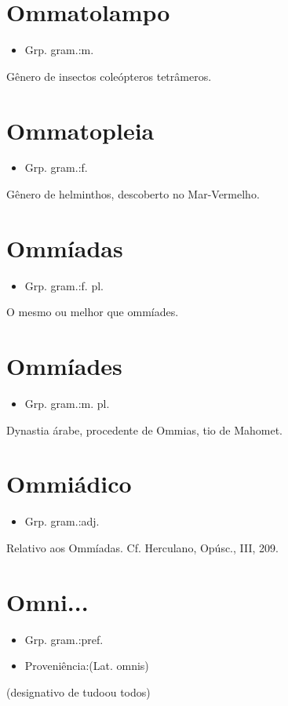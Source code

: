 \section{Ommatolampo}
\begin{itemize}
\item {Grp. gram.:m.}
\end{itemize}
Gênero de insectos coleópteros tetrâmeros.
\section{Ommatopleia}
\begin{itemize}
\item {Grp. gram.:f.}
\end{itemize}
Gênero de helminthos, descoberto no Mar-Vermelho.
\section{Ommíadas}
\begin{itemize}
\item {Grp. gram.:f. pl.}
\end{itemize}
O mesmo ou melhor que \textunderscore ommíades\textunderscore .
\section{Ommíades}
\begin{itemize}
\item {Grp. gram.:m. pl.}
\end{itemize}
Dynastia árabe, procedente de Ommias, tio de Mahomet.
\section{Ommiádico}
\begin{itemize}
\item {Grp. gram.:adj.}
\end{itemize}
Relativo aos Ommíadas. Cf. Herculano, \textunderscore Opúsc.\textunderscore , III, 209.
\section{Omni...}
\begin{itemize}
\item {Grp. gram.:pref.}
\end{itemize}
\begin{itemize}
\item {Proveniência:(Lat. \textunderscore omnis\textunderscore )}
\end{itemize}
(designativo de \textunderscore tudo\textunderscore  ou \textunderscore todos\textunderscore )
